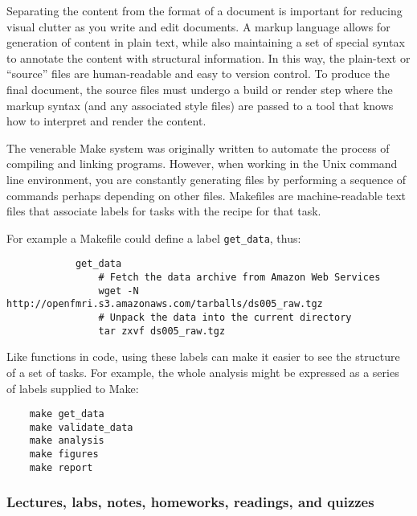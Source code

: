 Separating the content from the format of a document is important for reducing
visual clutter as you write and edit documents.
A markup language allows for generation of content in plain text, while also
maintaining a set of special syntax to annotate the content with structural
information.
In this way, the plain-text or ``source'' files are human-readable and easy to
version control.
To produce the final document, the source files must undergo a build or render
step where the markup syntax (and any associated style files) are passed to a
tool that knows how to interpret and render the content.


The venerable Make system was originally written to automate the process
of compiling and linking programs.
However, when working in the Unix command line environment, you are constantly
generating files by performing a sequence of commands perhaps depending on
other files.
Makefiles are machine-readable text files that associate labels for tasks with
the recipe for that task.

For example a Makefile could define a label \texttt{get\_data}, thus:

\begin{verbatim}
            get_data
                # Fetch the data archive from Amazon Web Services
                wget -N http://openfmri.s3.amazonaws.com/tarballs/ds005_raw.tgz
                # Unpack the data into the current directory
                tar zxvf ds005_raw.tgz
\end{verbatim}

Like functions in code, using these labels can make it easier to see the
structure of a set of tasks.  For example, the whole analysis might be
expressed as a series of labels supplied to Make:

\begin{verbatim}
    make get_data
    make validate_data
    make analysis
    make figures
    make report
\end{verbatim}

\subsubsection{Lectures, labs, notes, homeworks, readings, and quizzes}

